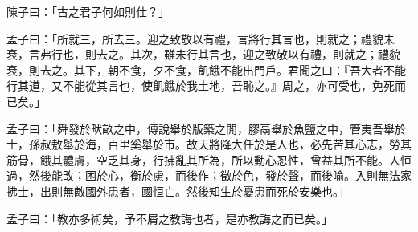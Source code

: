\begin{pinyinscope}
陳子曰：「古之君子何如則仕？」

孟子曰：「所就三，所去三。迎之致敬以有禮，言將行其言也，則就之；禮貌未衰，言弗行也，則去之。其次，雖未行其言也，迎之致敬以有禮，則就之；禮貌衰，則去之。其下，朝不食，夕不食，飢餓不能出門戶。君聞之曰：『吾大者不能行其道，又不能從其言也，使飢餓於我土地，吾恥之。』周之，亦可受也，免死而已矣。」

孟子曰：「舜發於畎畝之中，傅說舉於版築之閒，膠鬲舉於魚鹽之中，管夷吾舉於士，孫叔敖舉於海，百里奚舉於市。故天將降大任於是人也，必先苦其心志，勞其筋骨，餓其體膚，空乏其身，行拂亂其所為，所以動心忍性，曾益其所不能。人恒過，然後能改；困於心，衡於慮，而後作；徵於色，發於聲，而後喻。入則無法家拂士，出則無敵國外患者，國恒亡。然後知生於憂患而死於安樂也。」

孟子曰：「教亦多術矣，予不屑之教誨也者，是亦教誨之而已矣。」


\end{pinyinscope}